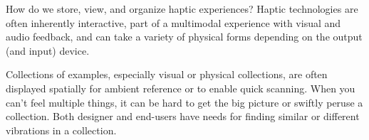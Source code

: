 

    How do we store, view, and organize haptic experiences?
    Haptic technologies are often inherently interactive, part of a multimodal experience with visual and audio feedback, and can take a variety of physical forms depending on the output (and input) device.

    
    Collections of examples, especially visual or physical collections, are often displayed spatially for ambient reference or to enable quick scanning.
    When you can't feel multiple things, it can be hard to get the big picture or swiftly peruse a collection.
    Both designer and end-users have needs for finding similar or different vibrations in a collection. %


%
%
